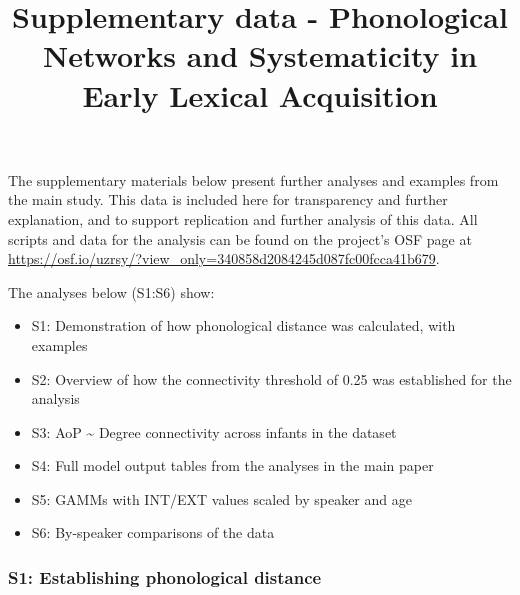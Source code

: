 \documentclass[
  man,floatsintext]{apa6}
\title{Supplementary data - Phonological Networks and Systematicity in Early Lexical Acquisition}
\author{\phantom{0}}
\date{}
\affiliation{\phantom{0}}
\providecommand{\tightlist}{%
  \setlength{\itemsep}{0pt}\setlength{\parskip}{0pt}}
\begin{document}
\maketitle

The supplementary materials below present further analyses and examples from the main study. This data is included here for transparency and further explanation, and to support replication and further analysis of this data. All scripts and data for the analysis can be found on the project's OSF page at \url{https://osf.io/uzrsy/?view_only=340858d2084245d087fc00fcca41b679}.

The analyses below (S1:S6) show:

\begin{itemize}
\tightlist
\item
  S1: Demonstration of how phonological distance was calculated, with examples
\item
  S2: Overview of how the connectivity threshold of 0.25 was established for the analysis
\item
  S3: AoP \textasciitilde{} Degree connectivity across infants in the dataset
\item
  S4: Full model output tables from the analyses in the main paper
\item
  S5: GAMMs with INT/EXT values scaled by speaker and age
\item
  S6: By-speaker comparisons of the data
\end{itemize}

\hypertarget{s1-establishing-phonological-distance}{%
\subsubsection{S1: Establishing phonological distance}\label{s1-establishing-phonological-distance}}
\end{document}
